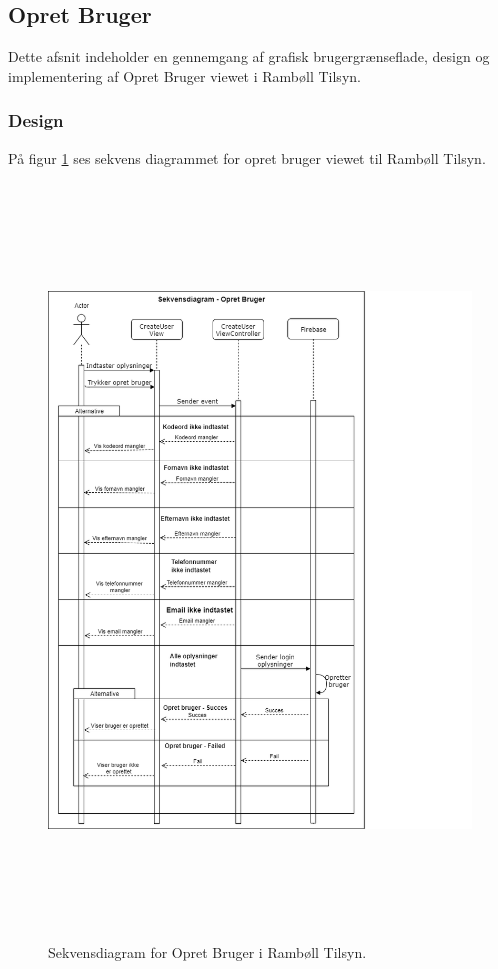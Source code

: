 \subsection{Opret Bruger}\label{sec:Opretbruger}
Dette afsnit indeholder en gennemgang af grafisk brugergrænseflade, design og implementering af Opret Bruger viewet i Rambøll Tilsyn.

\subsubsection{Design}
På figur \ref{fig:OpretBrugerSekvens} ses sekvens diagrammet for opret bruger viewet til Rambøll Tilsyn.
\begin{figure}[H] %
	\centering
	\includegraphics[height=20cm, width=15cm]{../ArkitekturDesign/Design/OpretBruger/OpretBrugerSekvensDiagram}
	\caption{Sekvensdiagram for Opret Bruger i Rambøll Tilsyn.}
	\label{fig:OpretBrugerSekvens}
\end{figure}

